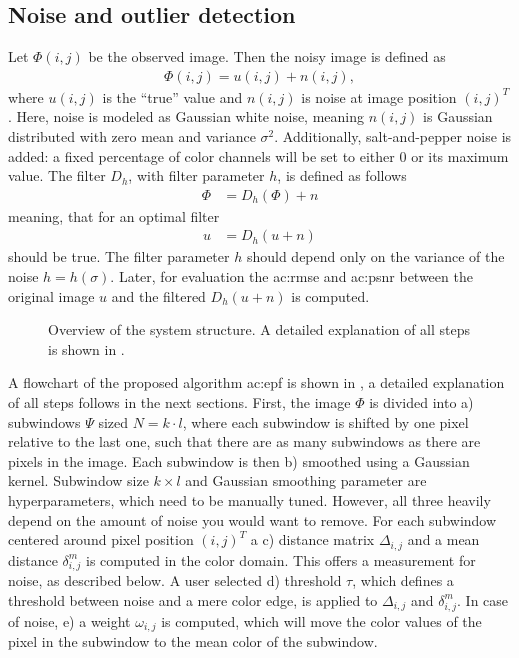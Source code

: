 \subsection{Noise and outlier detection}
\label{ssec:perception_methods_noiseandoutlierdetection}

Let $\Phi(i, j)$ be the observed image. 
Then the noisy image is defined as
\begin{align}
  \Phi\left(i,j\right) = u\left(i,j\right) + n\left(i,j\right),
\end{align}
where $u\left(i,j\right)$ is the ``true'' value and $n\left(i,j\right)$ is noise at image position $\left(i,j\right)^T$. 
Here, noise is modeled as Gaussian white noise, meaning $n\left(i,j\right)$ is Gaussian distributed with zero mean and variance $\sigma^2$.
Additionally, salt-and-pepper noise is added: a fixed percentage of color channels will be set to either $0$ or its maximum value.
The filter $D_h$, with filter parameter $h$, is defined as follows
\begin{align}
  \Phi &= D_{h}(\Phi) + n
\end{align}
meaning, that for an optimal filter
\begin{align}
  u &= D_h(u+n)
\end{align}
should be true. 
The filter parameter $h$ should depend only on the variance of the noise $h = h(\sigma)$. 
Later, for evaluation the \gls{ac:rmse} and \gls{ac:psnr} between the original image $u$ and the filtered $D_h(u+n)$ is computed.


\begin{figure}[t]
  \centering
  
    \caption{Overview of the system structure. A detailed explanation of all steps is shown in .}
  \label{fig:perception_methods_noiseandoutlierremoval_flowchart}
\end{figure}

A flowchart of the proposed algorithm \gls{ac:epf} is shown in , a detailed explanation of all steps follows in the next sections.
First, the image $\Phi$ is divided into a) subwindows $\Psi$ sized $N = k \cdot l$, where each subwindow is shifted by one pixel relative to the last one, such that there are as many subwindows as there are pixels in the image. 
Each subwindow is then b) smoothed using a Gaussian kernel. 
Subwindow size $k \times l$ and Gaussian smoothing parameter are hyperparameters, which need to be manually tuned.
However, all three heavily depend on the amount of noise you would want to remove. 
For each subwindow centered around pixel position $(i, j)^T$ a c) distance matrix $\Delta_{i,j}$ and a mean distance $\delta_{i,j}^m$ is computed in the color domain. 
This offers a measurement for noise, as described below. 
A user selected d) threshold $\tau$, which defines a threshold between noise and a mere color edge, is applied to $\Delta_{i,j}$ and $\delta_{i,j}^m$. 
In case of noise, e) a weight $\omega_{i,j}$ is computed, which will move the color values of the pixel in the subwindow to the mean color of the subwindow.

